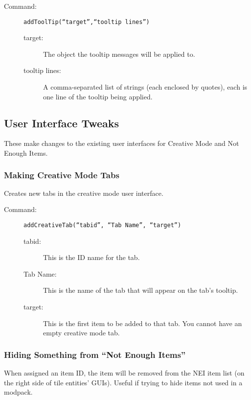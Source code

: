 \documentclass[letterpaper,titlepage,12pt]{article}
\begin{document}
\begin{description}
\item[Command:] \texttt{addToolTip(``\emph{target}'',``\emph{tooltip lines}'')}

\begin{description}
\item [target:] The object the tooltip messages will be applied to.
\item [tooltip lines:] A comma-separated list of strings (each enclosed by quotes), each is one line of the tooltip being applied.
\end{description}
\end{description}


\subsection{User Interface Tweaks}

These make changes to the existing user interfaces for Creative Mode and Not Enough Items.

\subsubsection{Making Creative Mode Tabs}

Creates new tabs in the creative mode user interface.

\begin{description}
\item[Command:] \texttt{addCreativeTab(``\emph{tabid}'', ``\emph{Tab Name}'', ``\emph{target}'')}

\begin{description}
\item [tabid:] This is the ID name for the tab.
\item [Tab Name:] This is the name of the tab that will appear on the tab's  tooltip.
\item [target:] This is the first item to be added to that tab.  You cannot have an empty creative mode tab.
\end{description}
\end{description}

\subsubsection{Hiding Something from ``Not Enough Items''}

When assigned an item ID, the item will be removed from the NEI item list (on the right side of tile entities' GUIs).  Useful if trying to hide items not used in a modpack.
\end{document}
